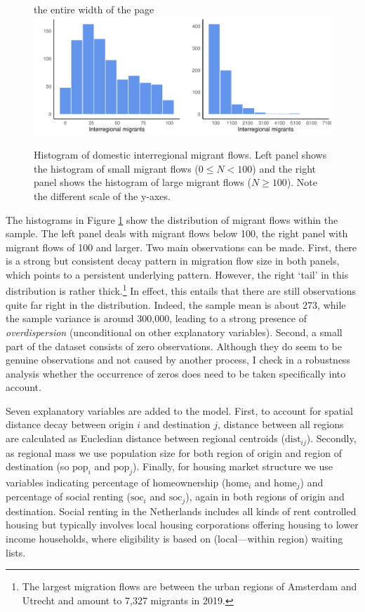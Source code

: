 \documentclass[11pt,parskip,abstracton,notitlepage, dvipsnames]{scrartcl}
\begin{document}
 \begin{figure}[ht]\centering %
the entire width of the page
\includegraphics[width=1.0\linewidth]{./../../fig/hist_mig_corop.pdf}
          \caption{Histogram of domestic interregional migrant flows. Left panel
shows the histogram of small migrant flows ($0 \leq N < 100$) and the right
panel shows the histogram of large migrant flows ($N \geq 100$). Note the
different scale of the y-axes.}
\label{fig:hist_mig_corop}
\end{figure}

The histograms in Figure \ref{fig:hist_mig_corop} show the distribution of
migrant flows within the sample. The left panel deals with migrant flows below
100, the right panel with migrant flows of 100 and larger. Two main observations
can be made. First, there is a strong but consistent decay pattern in migration
flow size in both panels, which points to a persistent underlying
pattern. However, the right `tail' in this distribution is rather
thick.\footnote{The largest migration flows are between the urban regions of
  Amsterdam and Utrecht and amount to 7,327 migrants in 2019.} In effect, this entails that there are
still observations quite far right in the distribution. Indeed, the sample mean
is about 273, while the sample variance is around 300,000, leading to a strong
presence of \emph{overdispersion} (unconditional on other explanatory
variables). Second, a small part of the dataset consists of zero
observations. Although they do seem to be genuine observations and not caused by
another process, I check in a robustness analysis whether the occurrence of
zeros does need to be taken specifically into account.

Seven explanatory variables are added to the model. First, to account for
spatial distance decay between origin $i$ and destination $j$, distance between
all regions are calculated as Eucledian distance between regional centroids
($\text{dist}_{ij}$). Secondly, as regional mass we use population size for
both region of origin and region of destination (so $\text{pop}_i$ and
$\text{pop}_j$). Finally, for housing market structure we use variables
indicating percentage of homeownership ($\text{home}_i$ and $\text{home}_j$) and
percentage of social renting ($\text{soc}_i$ and $\text{soc}_j$), again in both
regions of origin and destination. Social renting in the Netherlands includes all
kinds of rent controlled housing but typically involves local housing
corporations offering housing to lower income households, where eligibility is
based on (local---within region) waiting lists.
\end{document}

